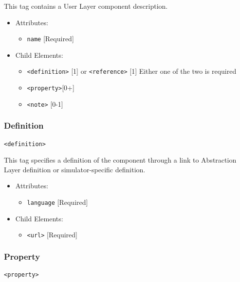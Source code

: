 \documentclass{article}
\begin{document}
This tag contains a User Layer component description.

\begin{itemize}
\item Attributes:
%
\begin{itemize}
\item \verb|name| {[}Required{]}
\end{itemize}

\item Child Elements:
%
\begin{itemize}
\item \verb|<definition>| {[}1{]} or \verb|<reference>| {[}1{]} Either one
of the two is required
\item \verb|<property>|{[}0+{]}
\item \verb|<note>| {[}0-1{]}
\end{itemize}

\end{itemize}

\subsubsection{Definition}
%
\begin{lstlisting}
<definition>
\end{lstlisting}

This tag specifies a definition of the component through a link to Abstraction
Layer definition or simulator-specific definition.

\begin{itemize}
\item Attributes:
%
\begin{itemize}
\item \verb|language| {[}Required{]}
\end{itemize}

\item Child Elements:
%
\begin{itemize}
\item \verb|<url>| {[}Required{]}
\end{itemize}

\end{itemize}

\subsubsection{Property}
%
\begin{lstlisting}
<property>
\end{lstlisting}
\end{document}
